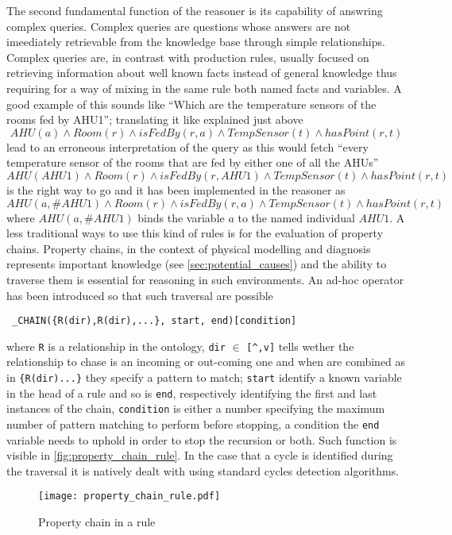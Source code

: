 The second fundamental function of the reasoner is its capability of answring complex queries. Complex queries are questions whose answers are not imeediately retrievable from the knowledge base through simple relationships. Complex queries are, in contrast with production rules, usually focused on retrieving information about well known facts instead of general knowledge thus requiring for a way of mixing in the same rule both named facts and variables. A good example of this sounds like ``Which are the temperature sensors of the rooms fed by AHU1''; translating it like explained just above
\begin{equation}
AHU(a)\land Room(r)\land isFedBy(r, a)\land TempSensor(t)\land hasPoint(r,t)
\end{equation}
lead to an erroneous interpretation of the query as this would fetch ``every temperature sensor of the rooms that are fed by either one of all the AHUs''
\begin{equation}
AHU(AHU1)\land Room(r)\land isFedBy(r, AHU1)\land TempSensor(t)\land hasPoint(r,t)
\end{equation}
is the right way to go and it has been implemented in the reasoner as \begin{equation}
AHU(a, \# AHU1)\land Room(r)\land isFedBy(r, a)\land TempSensor(t)\land hasPoint(r,t)
\end{equation}
where $AHU(a, \# AHU1)$ binds the variable $a$ to the named individual $AHU1$.
A less traditional ways to use this kind of rules is for the evaluation of property chains. Property chains, in the context of physical modelling and diagnosis represents important knowledge (see \autoref{sec:potential_causes}) and the ability to traverse them is essential for reasoning in such environments. An ad-hoc operator has been introduced so that such traversal are possible
\begin{verbatim}
 _CHAIN({R(dir),R(dir),...}, start, end)[condition]
\end{verbatim}
where \verb|R| is a relationship in the ontology, \verb|dir| $\in$ \verb|[^,v]| tells wether the relationship to chase is an incoming or out-coming one and when are combined as in \verb|{R(dir)...}| they specify a pattern to match; \verb|start| identify a known variable in the head of a rule and so is \verb|end|, respectively identifying the first and last instances of the chain, \verb|condition| is either a number specifying the maximum number of pattern matching to perform before stopping, a condition the \verb|end| variable needs to uphold in order to stop the recursion or both. Such function is visible in \autoref{fig:property_chain_rule}. In the case that a cycle is identified during the traversal it is natively dealt with using standard cycles detection algorithms.
\begin{figure}
  \centering
  \texttt{[image: property\_chain\_rule.pdf]}
  \caption{Property chain in a rule}
  \label{fig:property_chain_rule}
\end{figure}
